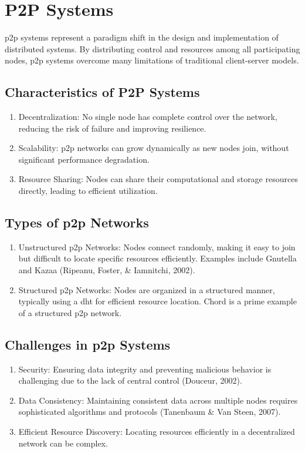 \chapter{P2P Systems}
\gls{p2p} systems represent a paradigm shift in the design and implementation of distributed systems.
By distributing control and resources among all participating nodes, \gls{p2p} systems overcome many limitations of traditional client-server models.

\section{Characteristics of P2P Systems}
\begin{enumerate}
    \item Decentralization: No single node has complete control over the network, reducing the risk of failure and improving resilience.
    \item Scalability: \gls{p2p} networks can grow dynamically as new nodes join, without significant performance degradation.
    \item Resource Sharing: Nodes can share their computational and storage resources directly, leading to efficient utilization.
\end{enumerate}

\section{Types of \gls{p2p} Networks}
\begin{enumerate}
    \item Unstructured \gls{p2p} Networks: Nodes connect randomly, making it easy to join but difficult to locate specific resources efficiently. Examples include Gnutella and Kazaa (Ripeanu, Foster, \& Iamnitchi, 2002).
    \item Structured \gls{p2p} Networks: Nodes are organized in a structured manner, typically using a \gls{dht} for efficient resource location.
    Chord is a prime example of a structured \gls{p2p} network.
\end{enumerate}

\section{Challenges in \gls{p2p} Systems}
\begin{enumerate}
    \item Security: Ensuring data integrity and preventing malicious behavior is challenging due to the lack of central control (Douceur, 2002).
    \item Data Consistency: Maintaining consistent data across multiple nodes requires sophisticated algorithms and protocols (Tanenbaum \& Van Steen, 2007).
    \item Efficient Resource Discovery: Locating resources efficiently in a decentralized network can be complex.
\end{enumerate}
